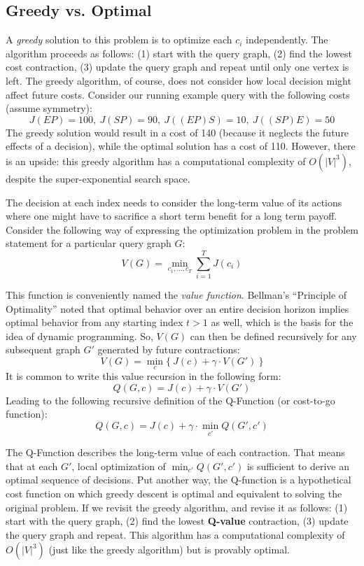 \subsection{Greedy vs. Optimal}
A \emph{greedy} solution to this problem is to optimize each $c_i$ independently. The algorithm proceeds as follows: (1) start with the query graph, (2) find the lowest cost contraction, (3) update the query graph and repeat until only one vertex is left. The greedy algorithm, of course, does not consider how local decision might affect future costs. Consider our running example query with the following costs (assume symmetry):
\[J(EP)= 100,~J(SP)= 90,~J((EP)S)= 10,~J((SP)E)= 50\]
The greedy solution would result in a cost of 140 (because it neglects the future effects of a decision), while the optimal solution has a cost of 110.
However, there is an upside: this greedy algorithm has a computational complexity of $O(|V|^3)$, despite the super-exponential search space.

The decision at each index needs to consider the long-term value of its actions where one might have to sacrifice a short term benefit for a long term payoff.
Consider the following way of expressing the optimization problem in the problem statement for a particular query graph $G$:
\begin{equation}
V(G) = \min_{c_1,...,c_T} \sum_{i=1}^T J(c_i)
\label{eq:main}
\end{equation}

 This function is conveniently named the \emph{value function}. Bellman's ``Principle of Optimality'' noted that optimal behavior over an entire decision horizon implies optimal behavior from any starting index $t>1$ as well, which is the basis for the idea of dynamic programming.
So, $V(G)$ can then be defined recursively for any subsequent graph $G'$ generated by future contractions:
\begin{equation}
V(G) = \min_{c}\{~J(c) + \gamma \cdot V(G') ~\}
\label{eq:value}
\end{equation}
It is common to write this value recursion in the following form:
\[
Q(G,c) = J(c) + \gamma \cdot V(G')
\]
Leading to the following recursive definition of the Q-Function (or cost-to-go function):
\begin{equation}
Q(G,c) = J(c) + \gamma \cdot \min_{c'} Q( G',c')
\label{eq:q}
\end{equation}

The Q-Function describes the long-term value of each contraction. 
That means that at each $G'$, local optimization of $\min_{c'} Q(G',c')$ is sufficient to derive an optimal sequence of decisions. Put another way, the Q-function is a hypothetical cost function on which greedy descent is optimal and equivalent to solving the original problem.
If we revisit the greedy algorithm, and revise it as follows: (1) start with the query graph, (2) find the lowest \textbf{Q-value} contraction, (3) update the query graph and repeat. This algorithm has a computational complexity of $O(|V|^3)$ (just like the greedy algorithm) but is provably optimal. 

